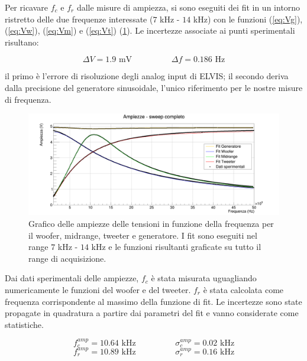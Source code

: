 \documentclass[12pt,italian]{article}
\begin{document}
Per ricavare $f_{c}$ e $f_{r}$ dalle misure di ampiezza, si sono eseguiti dei
fit in un intorno ristretto delle due frequenze interessate ($ 7 $ kHz - $ 14 $
kHz) con le funzioni (\ref{eq:Vg}), (\ref{eq:Vw}), (\ref{eq:Vm}) e
(\ref{eq:Vt}) (\cref{fig:amp_sweep}). Le incertezze associate ai punti
sperimentali risultano:

\begin{equation*}
	\Delta V = 1.9 \text{ mV} \hspace{2cm} \Delta f = 0.186 \text{ Hz}
\end{equation*}

\noindent
il primo è l'errore di risoluzione degli analog input di ELVIS; il secondo
deriva dalla precisione del generatore sinusoidale, l'unico riferimento per
le nostre misure di frequenza.

\begin{figure}[h]
	\centering
	\includegraphics[width=\textwidth]{fig_amp.png}
	\caption{Grafico delle ampiezze delle tensioni in funzione della frequenza per il woofer, midrange, tweeter e generatore. I fit sono eseguiti nel range $7$ kHz - $14$ kHz e le funzioni risultanti graficate su tutto il range di acquisizione.}\label{fig:fc_fr}
	\label{fig:amp_sweep}
\end{figure}

Dai dati sperimentali delle ampiezze, $f_{c}$ è stata misurata uguagliando
numericamente le funzioni del woofer e del tweeter. $f_{r}$ è stata calcolata
come frequenza corrispondente al massimo della funzione di fit. Le incertezze
sono state propagate in quadratura a partire dai parametri del fit e vanno
considerate come statistiche.

\begin{equation*}
	f_{c}^{amp} = 10.64 \text{ kHz} \hspace{2cm} \sigma_c^{amp} = 0.02 \text{ kHz}
\end{equation*}
\begin{equation*}
	f_{r}^{amp} = 10.89 \text{ kHz} \hspace{2cm} \sigma_r^{amp} = 0.16 \text{ kHz}
\end{equation*}
\end{document}
